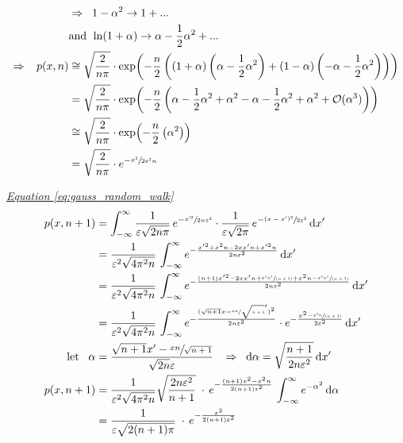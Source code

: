 \documentclass[a4paper, parskip=half]{scrartcl}
\newcommand{\diff}{\mathop{}\!\mathrm{d}}
\newcommand{\myEqRef}[1]{\textit{\hyperref[eq:#1]{Equation \ref*{eq:#1}}}}
\begin{document}
\begin{align}
&\Rightarrow\;\;  1-\alpha^2 \rightarrow 1 + ... \; \\
&\mathrm{and}\;\,\ln\!\left(1+\alpha\right) \rightarrow \alpha - \frac{1}{2}\alpha^2 + ... \\
\Rightarrow \;\;\; p(x,n) &\cong \sqrt{\frac{2}{n\pi}} \cdot \exp\!\left(-\frac{n}{2}\left(\left(1+\alpha\right)\left(\alpha - \frac{1}{2} \alpha^2 \right) +\left(1-\alpha\right)\left(-\alpha - \frac{1}{2} \alpha^2 \right)\right) \right)\\
&= \sqrt{\frac{2}{n\pi}} \cdot \exp\!\left(-\frac{n}{2}\left(\alpha -\frac{1}{2} \alpha^2 + \alpha^2 - \alpha - \frac{1}{2} \alpha^2 + \alpha^2 + \mathcal{O}(\alpha^3)\right) \right) \\
&\cong \sqrt{\frac{2}{n\pi}} \cdot \exp\!\left(-\frac{n}{2}\left(\alpha^2\right) \right)\\
&= \sqrt{\frac{2}{n\pi}} \cdot e^{-\sfrac{x^2}{2\varepsilon^2n}}
\end{align}

\myEqRef{gauss_random_walk}
\begin{align}
p(x,n+1) &= \int_{-\infty}^\infty \frac{1}{\varepsilon\sqrt{2n\pi}}\, e^{-\sfrac{x'^2}{2n\varepsilon^2}} \cdot \frac{1}{\varepsilon\sqrt{2\pi}}\, e^{-\sfrac{(x - x')^2}{2\varepsilon^2}} \diff x'\\
&= \frac{1}{\varepsilon^2\sqrt{4\pi^2n}} \, \int_{-\infty}^\infty e^{-\frac{x'^2 + x^2n - 2xx'n +x'^2n}{2n\varepsilon^2}}\diff x' \\
&= \frac{1}{\varepsilon^2\sqrt{4\pi^2n}} \, \int_{-\infty}^\infty e^{-\frac{(n+1)x'^2 - 2xx'n + \sfrac{x^2n^2}{(n+1)} + x^2n - \sfrac{x^2n^2}{(n+1)}}{2n\varepsilon^2}}\diff x' \\
&= \frac{1}{\varepsilon^2\sqrt{4\pi^2n}} \, \int_{-\infty}^\infty e^{-\frac{(\sqrt{n+1}x - \sfrac{xn}{\sqrt{n+1}}')^2}{2n\varepsilon^2}} \cdot e^{- \frac{x^2 - \sfrac{x^2n}{(n+1)}}{2\varepsilon^2}}\diff x' \\
\mathrm{let}\;\;\; \alpha &= \frac{\sqrt{n+1}x' - \sfrac{xn}{\sqrt{n+1}}}{\sqrt{2n}\varepsilon}
\;\;\; \Rightarrow \;\;\diff\alpha = \sqrt{\frac{n+1}{2n\varepsilon^2}} \diff x' \notag\\
p(x,n+1) &= \frac{1}{\varepsilon^2\sqrt{4\pi^2n}} \sqrt{\frac{2n\varepsilon^2}{n+1}}\;\cdot\, e^{-\frac{(n+1)x^2 - x^2n}{2(n+1)\varepsilon^2}}\, \int_{-\infty}^\infty e^{-\alpha^2} \diff\alpha\notag\\
&= \frac{1}{\varepsilon\sqrt{2(n+1)\pi}}\;\cdot\, e^{-\frac{x^2}{2(n+1)\varepsilon^2}}\notag
\end{align}
\end{document}
